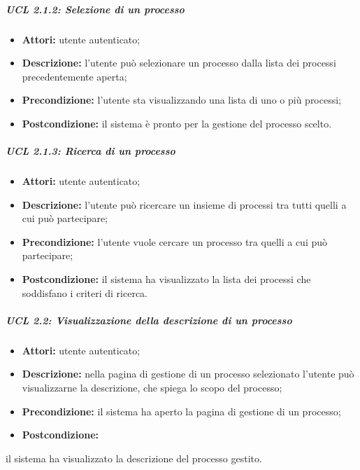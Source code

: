 \subparagraph{UCL 2.1.2: Selezione di un processo}
\begin{itemize}
\item \textbf{Attori:} utente autenticato;
\item \textbf{Descrizione:} l'utente può selezionare un processo dalla lista dei processi precedentemente aperta;
\item \textbf{Precondizione:} l'utente sta visualizzando una lista di uno o più processi;
\item \textbf{Postcondizione:} il sistema è pronto per la gestione del processo scelto.
\end{itemize}

\subparagraph{UCL 2.1.3: Ricerca di un processo}
\begin{itemize}
\item \textbf{Attori:} utente autenticato;
\item \textbf{Descrizione:} l'utente può ricercare un insieme di processi tra tutti quelli a cui può partecipare;
\item \textbf{Precondizione:} l'utente vuole cercare un processo tra quelli a cui può partecipare;
\item \textbf{Postcondizione:} il sistema ha visualizzato la lista dei processi che soddisfano i criteri di ricerca.
\end{itemize}

\subparagraph{UCL 2.2: Visualizzazione della descrizione di un processo}
\begin{itemize}
\item \textbf{Attori:} utente autenticato;
\item \textbf{Descrizione:} nella pagina di gestione di un processo selezionato l'utente può visualizzarne la descrizione, che spiega lo scopo del processo;
\item \textbf{Precondizione:} il sistema ha aperto la pagina di gestione di un processo;
\item \textbf{Postcondizione:}
\end{itemize} il sistema ha visualizzato la descrizione del processo gestito.

